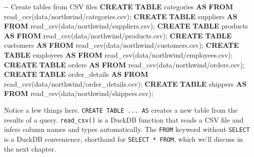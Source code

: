 \documentclass[
  letterpaper,
  DIV=11,
  numbers=noendperiod]{scrreprt}
\newenvironment{Shaded}{\begin{snugshade}}{\end{snugshade}}
\newcommand{\CommentTok}[1]{\textcolor[rgb]{0.37,0.37,0.37}{#1}}
\newcommand{\KeywordTok}[1]{\textcolor[rgb]{0.00,0.23,0.31}{\textbf{#1}}}
\newcommand{\NormalTok}[1]{\textcolor[rgb]{0.00,0.23,0.31}{#1}}
\newcommand{\StringTok}[1]{\textcolor[rgb]{0.13,0.47,0.30}{#1}}
\begin{document}
\begin{codelisting}

\caption{\texttt{duckdb}}

\begin{Shaded}
\begin{Highlighting}[]
\CommentTok{{-}{-} Create tables from CSV files}
\KeywordTok{CREATE} \KeywordTok{TABLE}\NormalTok{ categories }\KeywordTok{AS} \KeywordTok{FROM}\NormalTok{ read\_csv(}\StringTok{\textquotesingle{}data/northwind/categories.csv\textquotesingle{}}\NormalTok{);}
\KeywordTok{CREATE} \KeywordTok{TABLE}\NormalTok{ suppliers }\KeywordTok{AS} \KeywordTok{FROM}\NormalTok{ read\_csv(}\StringTok{\textquotesingle{}data/northwind/suppliers.csv\textquotesingle{}}\NormalTok{);}
\KeywordTok{CREATE} \KeywordTok{TABLE}\NormalTok{ products }\KeywordTok{AS} \KeywordTok{FROM}\NormalTok{ read\_csv(}\StringTok{\textquotesingle{}data/northwind/products.csv\textquotesingle{}}\NormalTok{);}
\KeywordTok{CREATE} \KeywordTok{TABLE}\NormalTok{ customers }\KeywordTok{AS} \KeywordTok{FROM}\NormalTok{ read\_csv(}\StringTok{\textquotesingle{}data/northwind/customers.csv\textquotesingle{}}\NormalTok{);}
\KeywordTok{CREATE} \KeywordTok{TABLE}\NormalTok{ employees }\KeywordTok{AS} \KeywordTok{FROM}\NormalTok{ read\_csv(}\StringTok{\textquotesingle{}data/northwind/employees.csv\textquotesingle{}}\NormalTok{);}
\KeywordTok{CREATE} \KeywordTok{TABLE}\NormalTok{ orders }\KeywordTok{AS} \KeywordTok{FROM}\NormalTok{ read\_csv(}\StringTok{\textquotesingle{}data/northwind/orders.csv\textquotesingle{}}\NormalTok{);}
\KeywordTok{CREATE} \KeywordTok{TABLE}\NormalTok{ order\_details }\KeywordTok{AS} \KeywordTok{FROM}\NormalTok{ read\_csv(}\StringTok{\textquotesingle{}data/northwind/order\_details.csv\textquotesingle{}}\NormalTok{);}
\KeywordTok{CREATE} \KeywordTok{TABLE}\NormalTok{ shippers }\KeywordTok{AS} \KeywordTok{FROM}\NormalTok{ read\_csv(}\StringTok{\textquotesingle{}data/northwind/shippers.csv\textquotesingle{}}\NormalTok{);}
\end{Highlighting}
\end{Shaded}

\end{codelisting}

Notice a few things here. \texttt{CREATE\ TABLE\ ...\ AS} creates a new
table from the results of a query. \texttt{read\_csv()} is a DuckDB
function that reads a CSV file and infers column names and types
automatically. The \texttt{FROM} keyword without \texttt{SELECT} is a
DuckDB convenience, shorthand for \texttt{SELECT\ *\ FROM}, which we'll
discuss in the next chapter.
\end{document}
